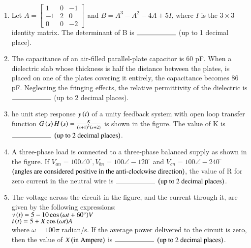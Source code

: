 \documentclass[journal,12pt,onecolumn]{IEEEtran}
\theoremstyle{remark}
\begin{document}
\begin{enumerate}[start=40]
	\item Let $A = \begin{bmatrix} 
	1 & 0 & -1 \\
	-1 & 2 & 0 \\
	0 & 0 & -2
	\end{bmatrix}$ and $B = A^3 - A^2 - 4A + 5I$, where $I$ is the $3\times3$ identity matrix. The determinant of B is $\rule{2cm}{0.4pt}$ (up to 1 decimal place).\\

        \item The capacitance of an air-filled parallel-plate capacitor is $60$ pF. When a dielectric slab whose thickness is half the distance between the plates, is placed on one of the plates covering it entirely, the capacitance becomes $86$ pF. Neglecting the fringing effects, the relative permittivity of the dielectric is $\rule{2cm}{0.4pt}$ (up to 2 decimal places).\\

	\item he unit step response $y\left(t\right)$ of a unity feedback system with open loop transfer function $G\left(s\right)H\left(s\right)=\frac{K}{\left(s+1\right)^2\left(s+2\right)}$ is shown in the figure. The value of K is $\rule{2cm}{0.4pt}$ $\left(\text{up to 2 decimal places}\right)$.\\
\begin{figure}[H]
    \centering
\end{figure}
		


	\item A three-phase load is connected to a three-phase balanced supply as shown in the figure. If $V_{an}=100\angle0^\circ,V_{bn}=100\angle-120^\circ$ and $V_{cn}=100\angle-240^\circ$ $\left(\text{angles are considered positive in the anti-clockwise direction}\right)$, the value of R for zero current in the neutral wire is $\rule{2cm}{0.4pt}$ $\left(\text{up to 2 decimal places}\right)$.\\
\begin{figure}[H]
    \centering
\end{figure}
		

	\item The voltage across the circuit in the figure, and the current through it, are given by the following expressions:\\$v\left(t\right)=5-10\cos{\ensuremath{\left(\omega t+60^\circ\right)}}V$\\$i\left(t\right)=5+X\cos{\ensuremath{\left(\omega t\right)}}A$\\
	where $\omega =100\pi$ radian/s. If the average power delivered to the circuit is zero, then the value of $X\left(\text{in Ampere}\right)$ is $\rule{2cm}{0.4pt}$ $\left(\text{up to 2 decimal places}\right)$.\\
\begin{figure}[H]
    \centering
\end{figure}
		


\end{enumerate}
\end{document}
